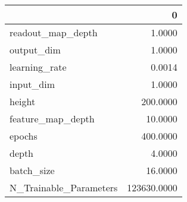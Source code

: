 \begin{tabular}{lr}
\toprule
{} &            0 \\
\midrule
readout\_map\_depth      &       1.0000 \\
output\_dim             &       1.0000 \\
learning\_rate          &       0.0014 \\
input\_dim              &       1.0000 \\
height                 &     200.0000 \\
feature\_map\_depth      &      10.0000 \\
epochs                 &     400.0000 \\
depth                  &       4.0000 \\
batch\_size             &      16.0000 \\
N\_Trainable\_Parameters &  123630.0000 \\
\bottomrule
\end{tabular}
